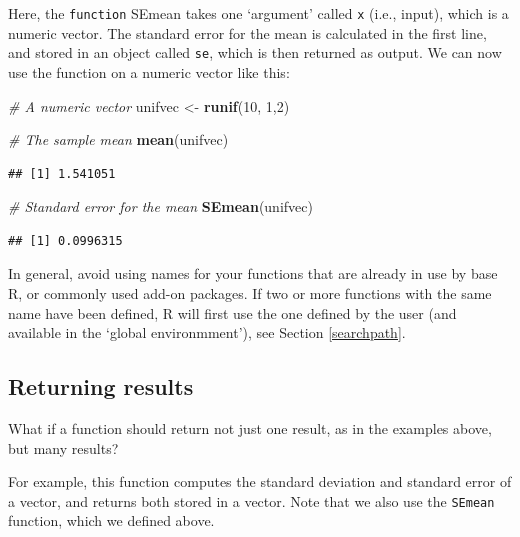 \documentclass[]{book}
\newenvironment{Shaded}{\begin{snugshade}}{\end{snugshade}}
\newcommand{\CommentTok}[1]{\textcolor[rgb]{0.56,0.35,0.01}{\textit{#1}}}
\newcommand{\DecValTok}[1]{\textcolor[rgb]{0.00,0.00,0.81}{#1}}
\newcommand{\KeywordTok}[1]{\textcolor[rgb]{0.13,0.29,0.53}{\textbf{#1}}}
\newcommand{\NormalTok}[1]{#1}
\newcommand{\StringTok}[1]{\textcolor[rgb]{0.31,0.60,0.02}{#1}}
\let\BeginKnitrBlock\begin \let\EndKnitrBlock\end
\begin{document}
Here, the \texttt{function} SEmean takes one `argument' called \texttt{x} (i.e., input), which is a numeric vector. The standard error for the mean is calculated in the first line, and stored in an object called \texttt{se}, which is then returned as output. We can now use the function on a numeric vector like this:

\begin{Shaded}
\begin{Highlighting}[]
\CommentTok{# A numeric vector}
\NormalTok{unifvec <-}\StringTok{ }\KeywordTok{runif}\NormalTok{(}\DecValTok{10}\NormalTok{, }\DecValTok{1}\NormalTok{,}\DecValTok{2}\NormalTok{)}

\CommentTok{# The sample mean}
\KeywordTok{mean}\NormalTok{(unifvec)}
\end{Highlighting}
\end{Shaded}

\begin{verbatim}
## [1] 1.541051
\end{verbatim}

\begin{Shaded}
\begin{Highlighting}[]
\CommentTok{# Standard error for the mean}
\KeywordTok{SEmean}\NormalTok{(unifvec)}
\end{Highlighting}
\end{Shaded}

\begin{verbatim}
## [1] 0.0996315
\end{verbatim}

\BeginKnitrBlock{rmdinfo}
In general, avoid using names for your functions that are already in use by base R, or commonly used add-on packages. If two or more functions with the same name have been defined, R will first use the one defined by the user (and available in the `global environmment'), see Section \ref{searchpath}.
\EndKnitrBlock{rmdinfo}

\hypertarget{returning-results}{%
\subsection{Returning results}\label{returning-results}}

What if a function should return not just one result, as in the examples above, but many results?

For example, this function computes the standard deviation and standard error of a vector, and returns both stored in a vector. Note that we also use the \texttt{SEmean} function, which we defined above.
\end{document}
